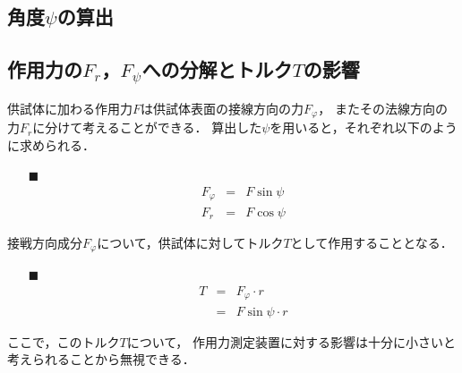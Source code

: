 \documentclass[twocolumn,a4j]{jsarticle}
\begin{document}
\subsection{角度$\psi$の算出}

\subsection{作用力の$F_r$，$F_\psi$への分解とトルク$T$の影響}

供試体に加わる作用力$F$は供試体表面の接線方向の力$F_\varphi$，
またその法線方向の力$F_r$に分けて考えることができる．
算出した$\psi$を用いると，それぞれ以下のように求められる．

\begin{itemize}
    \item [$\blacksquare$] 
          \begin{eqnarray*}
              F_\varphi &=& F \sin \psi \\
              F_r &=& F \cos \psi
          \end{eqnarray*}
\end{itemize}

接戦方向成分$F_\varphi$について，供試体に対してトルク$T$として作用することとなる．

\begin{itemize}
    \item [$\blacksquare$] 
          \begin{eqnarray*}
              T &=& F_\varphi \cdot r\\
              &=& F \sin \psi \cdot r
          \end{eqnarray*}
\end{itemize}

ここで，このトルク$T$について，
作用力測定装置に対する影響は十分に小さいと考えられることから無視できる．
\end{document}
